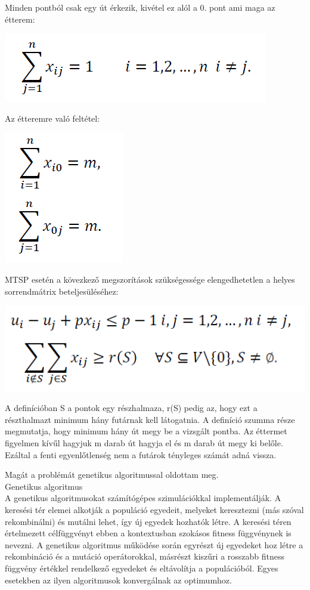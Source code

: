 Minden pontból csak egy út érkezik, kivétel ez alól a 0. pont ami maga az étterem:

\includegraphics[scale=0.5]{images/mtsp3.png}

Az étteremre való feltétel:

\includegraphics[scale=0.5]{images/mtsp4.png}

MTSP esetén a kövezkező megszorítások szükségessége elengedhetetlen a helyes sorrendmátrix beteljesüléséhez:

\includegraphics[scale=0.5]{images/mtsp5.png}

A definícióban S a pontok egy részhalmaza, r(S) pedig az, hogy ezt a részthalmazt minimum hány futárnak kell látogatnia. A definíció szumma része megmutatja, hogy minimum hány út megy be a vizsgált pontba. Az éttermet figyelmen kívűl hagyjuk m darab út hagyja el és m darab út megy ki belőle. Ezáltal a fenti egyenlőtlenség nem a futárok tényleges számát adná vissza. 

Magát a problémát genetikus algoritmussal oldottam meg.\\

Genetikus algoritmus \\

A genetikus algoritmusokat számítógépes szimulációkkal implementálják. A keresési tér elemei alkotják a populáció egyedeit, melyeket keresztezni (más szóval rekombinálni) és mutálni lehet, így új egyedek hozhatók létre. A keresési téren értelmezett célfüggvényt ebben a kontextusban szokásos fitness függvénynek is nevezni. A genetikus algoritmus működése során egyrészt új egyedeket hoz létre a rekombináció és a mutáció operátorokkal, másrészt kiszűri a rosszabb fitness függvény értékkel rendelkező egyedeket és eltávolítja a populációból. Egyes esetekben az ilyen algoritmusok konvergálnak az optimumhoz.

